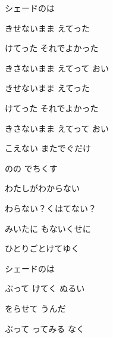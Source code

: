 \documentclass[a4paper,tate,twocolumn,12pt]{ltjtarticle}
\begin{document}
\thispagestyle{empty}

\begin{center}
{\LARGE シェードのは}
\end{center}

\vspace{1em}

\begin{flushleft}

\noindent\begin{minipage}{\linewidth}
きせないまま えてった

けてった それでよかった

きさないまま えてって おい

きせないまま えてった

けてった それでよかった

きさないまま えてって おい
\end{minipage}

\vspace{2em}

\noindent\begin{minipage}{\linewidth}
こえない またでぐだけ

のの でちくす

わたしがわからない

わらない？くはてない？

みいたに もないくせに

ひとりごとけてゆく

シェードのは
\end{minipage}

\vspace{2em}

\noindent\begin{minipage}{\linewidth}
ぶって けてく ぬるい

をらせて うんだ 

ぶって ってみる なく


\end{minipage}
\end{flushleft}
\end{document}
